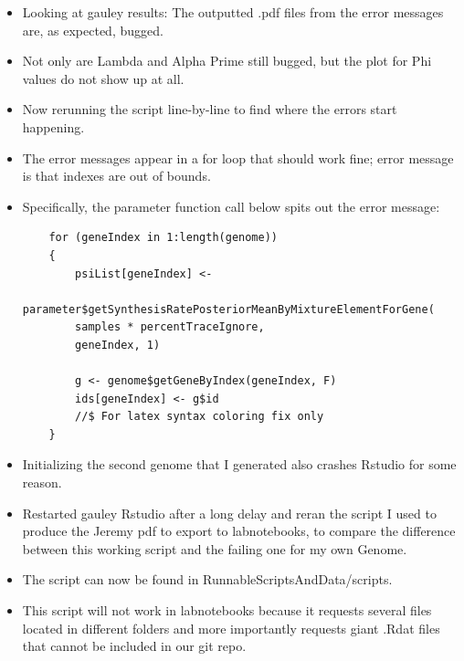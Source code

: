 \documentclass[12pt,hyperref]{labbook}
\begin{document}
\begin{itemize}
    \item Looking at gauley results: The outputted .pdf files from the error messages are, as expected, bugged.
    \item Not only are Lambda and Alpha Prime still bugged, but the plot for Phi values do not show up at all.
    \item Now rerunning the script line-by-line to find where the errors start happening.
    \item The error messages appear in a for loop that should work fine; error message is that indexes are out of bounds.
    \item Specifically, the parameter function call below spits out the error message:
    \begin{lstlisting}
    for (geneIndex in 1:length(genome))
    {
        psiList[geneIndex] <- 
        parameter$getSynthesisRatePosteriorMeanByMixtureElementForGene(
        samples * percentTraceIgnore, 
        geneIndex, 1)

        g <- genome$getGeneByIndex(geneIndex, F)
        ids[geneIndex] <- g$id
        //$ For latex syntax coloring fix only
    }
    \end{lstlisting}
    \item Initializing the second genome that I generated also crashes Rstudio for some reason.
    \item Restarted gauley Rstudio after a long delay and reran the script I used to produce the Jeremy pdf to export to labnotebooks, to compare the difference between this working script and the failing one for my own Genome.
    \item The script can now be found in RunnableScriptsAndData/scripts.
    \item This script will not work in labnotebooks because it requests several files located in different folders and more importantly requests giant .Rdat files that cannot be included in our git repo.
\end{itemize}

\end{document}
